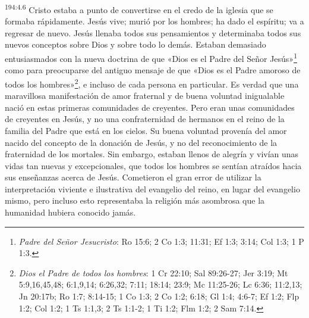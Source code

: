 \par
\textsuperscript{194:4.6} Cristo estaba a punto de convertirse en el credo de la iglesia que se formaba rápidamente. Jesús vive; murió por los hombres; ha dado el espíritu; va a regresar de nuevo. Jesús llenaba todos sus pensamientos y determinaba todos sus nuevos conceptos sobre Dios y sobre todo lo demás. Estaban demasiado entusiasmados con la nueva doctrina de que «Dios es el Padre del Señor Jesús»\footnote{\textit{Padre del Señor Jesucristo}: Ro 15:6; 2 Co 1:3; 11:31; Ef 1:3; 3:14; Col 1:3; 1 P 1:3.} como para preocuparse del antiguo mensaje de que «Dios es el Padre amoroso de todos los hombres»\footnote{\textit{Dios el Padre de todos los hombres}: 1 Cr 22:10; Sal 89:26-27; Jer 3:19; Mt 5:9,16,45,48; 6:1,9,14; 6:26,32; 7:11; 18:14; 23:9; Mc 11:25-26; Lc 6:36; 11:2,13; Jn 20:17b; Ro 1:7; 8:14-15; 1 Co 1:3; 2 Co 1:2; 6:18; Gl 1:4; 4:6-7; Ef 1:2; Flp 1:2; Col 1:2; 1 Ts 1:1,3; 2 Ts 1:1-2; 1 Ti 1:2; Flm 1:2; 2 Sam 7:14.}, e incluso de cada persona en particular. Es verdad que una maravillosa manifestación de amor fraternal y de buena voluntad inigualable nació en estas primeras comunidades de creyentes. Pero eran unas comunidades de creyentes en Jesús, y no una confraternidad de hermanos en el reino de la familia del Padre que está en los cielos. Su buena voluntad provenía del amor nacido del concepto de la donación de Jesús, y no del reconocimiento de la fraternidad de los mortales. Sin embargo, estaban llenos de alegría y vivían unas vidas tan nuevas y excepcionales, que todos los hombres se sentían atraídos hacia sus enseñanzas acerca de Jesús. Cometieron el gran error de utilizar la interpretación viviente e ilustrativa del evangelio del reino, en lugar del evangelio mismo, pero incluso esto representaba la religión más asombrosa que la humanidad hubiera conocido jamás.

